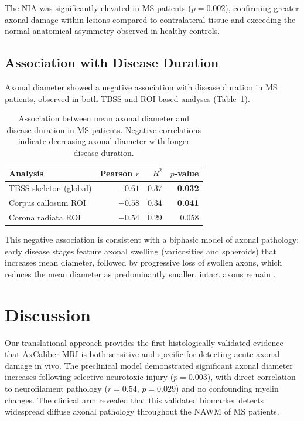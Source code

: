 \documentclass[11pt]{article}
\begin{document}
The NIA was significantly elevated in MS patients ($p = 0.002$), confirming greater axonal damage within lesions compared to contralateral tissue and exceeding the normal anatomical asymmetry observed in healthy controls.

\subsection{Association with Disease Duration}

Axonal diameter showed a negative association with disease duration in MS patients, observed in both TBSS and ROI-based analyses (Table~\ref{tab:duration}).

\begin{table}[H]
\centering
\caption{Association between mean axonal diameter and disease duration in MS patients. Negative correlations indicate decreasing axonal diameter with longer disease duration.}
\label{tab:duration}
\begin{tabular}{lrrr}
\toprule
\textbf{Analysis} & \textbf{Pearson $r$} & \textbf{$R^2$} & \textbf{$p$-value} \\
\midrule
TBSS skeleton (global) & $-0.61$ & 0.37 & \textbf{0.032} \\
Corpus callosum ROI & $-0.58$ & 0.34 & \textbf{0.041} \\
Corona radiata ROI & $-0.54$ & 0.29 & 0.058 \\
\bottomrule
\end{tabular}
\end{table}

This negative association is consistent with a biphasic model of axonal pathology: early disease stages feature axonal swelling (varicosities and spheroids) that increases mean diameter, followed by progressive loss of swollen axons, which reduces the mean diameter as predominantly smaller, intact axons remain \citep{nikic2011protective}.

\section{Discussion}

Our translational approach provides the first histologically validated evidence that AxCaliber MRI is both sensitive and specific for detecting acute axonal damage in vivo. The preclinical model demonstrated significant axonal diameter increases following selective neurotoxic injury ($p = 0.003$), with direct correlation to neurofilament pathology ($r = 0.54$, $p = 0.029$) and no confounding myelin changes. The clinical arm revealed that this validated biomarker detects widespread diffuse axonal pathology throughout the NAWM of MS patients.
\end{document}
